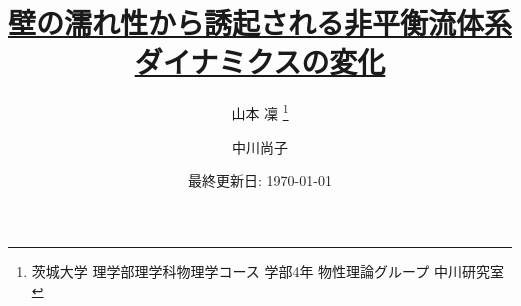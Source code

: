 \documentclass[dvipdfmx]{jsreport}
\begin{document}
\title{\href{https://github.com/m-agnet/Report.git}{壁の濡れ性から誘起される非平衡流体系ダイナミクスの変化}}
\author{山本 凜 \thanks{茨城大学 理学部理学科物理学コース 学部4年 物性理論グループ 中川研究室} \and 中川尚子 }
\date{最終更新日: \today}
\maketitle
\newpage

\setcounter{tocdepth}{3}
\tableofcontents
\newpage








% 
% 
% 



\end{document}
